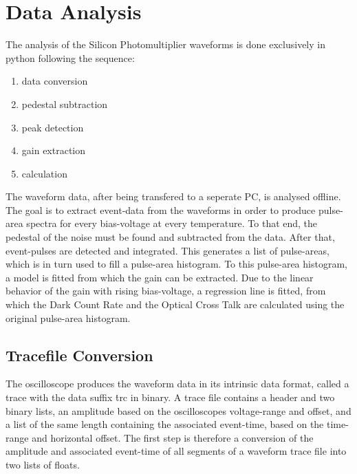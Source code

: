 \documentclass[12pt,article,type=msc,colorback,accentcolor=tud9c]{tudthesis}
\begin{document}
\newpage

\section{Data Analysis}
The analysis of the Silicon Photomultiplier waveforms is done exclusively in python following the sequence:
\begin{enumerate}
\item data conversion
\item pedestal subtraction
\item peak detection
\item gain extraction
\item calculation
\end{enumerate}
The waveform data, after being transfered to a seperate PC, is analysed offline. The goal is to extract event-data from the waveforms in order to produce pulse-area spectra for every bias-voltage at every temperature. To that end, the pedestal of the noise must be found and subtracted from the data. After that, event-pulses are detected and integrated. This generates a list of pulse-areas, which is in turn used to fill a pulse-area histogram. To this pulse-area histogram, a model is fitted from which the gain can be extracted. Due to the linear behavior of the gain with rising bias-voltage, a regression line is fitted, from which the Dark Count Rate and the Optical Cross Talk are calculated using the original pulse-area histogram.

\subsection{Tracefile Conversion}
The oscilloscope produces the waveform data in its intrinsic data format, called a trace with the data suffix \.trc in binary. A trace file contains a header and two binary lists, an amplitude based on the oscilloscopes voltage-range and offset, and a list of the same length containing the associated event-time, based on the time-range and horizontal offset. The first step is therefore a conversion of the amplitude and associated event-time of all segments of a waveform trace file into two lists of floats. 
\end{document}
